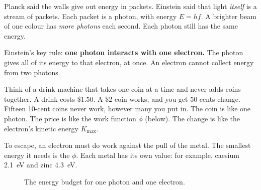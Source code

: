 Planck said the walls give out energy in packets. Einstein said that light
\emph{itself} is a stream of packets. Each packet is a photon, with energy
$E = hf$. A brighter beam of one colour has \emph{more photons} each second. Each
photon still has the same energy.

Einstein's key rule: \textbf{one photon interacts with one electron.} The photon
gives all of its energy to that electron, at once. An electron cannot collect energy
from two photons.

Think of a drink machine that takes one coin at a time and never adds coins
together. A drink costs \$1.50. A \$2 coin works, and you get 50 cents change.
Fifteen 10-cent coins never work, however many you put in. The coin is like one
photon. The price is like the work function $\phi$ (below). The change is like the
electron's kinetic energy $K_\mathrm{max}$.

To escape, an electron must do work against the pull of the metal. The smallest
energy it needs is the  $\phi$. Each metal has its own value: for
example, caesium \qty{2.1}{eV} and zinc \qty{4.3}{eV}.

\begin{figure}
  \centering
  \caption{The energy budget for one photon and one electron.}\label{ch3:fig:budget}
\end{figure}

